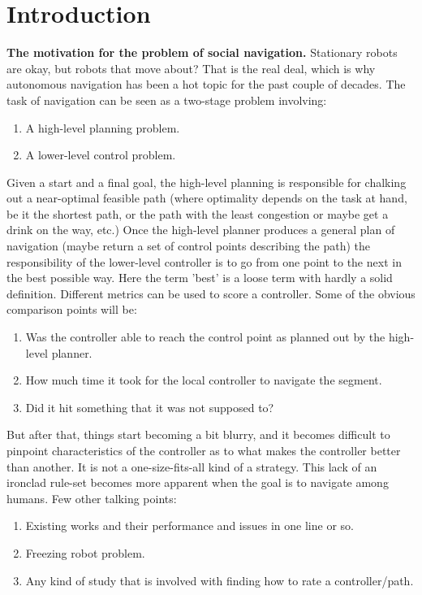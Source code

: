 \part{\rm\bfseries Introduction}
\label{ch:introduction}
\textbf{The motivation for the problem of social navigation.}
Stationary robots are okay, but robots that move about? That is the real deal, which is why autonomous navigation has been a hot topic for the past couple of decades. The task of navigation can be seen as a two-stage problem involving:
\begin{enumerate}
    \item A high-level planning problem.
    \item A lower-level control problem.
\end{enumerate}
Given a start and a final goal, the high-level planning is responsible for chalking out a near-optimal feasible path (where optimality depends on the task at hand, be it the shortest path, or the path with the least congestion or maybe get a drink on the way, etc.) Once the high-level planner produces a general plan of navigation (maybe return a set of control points describing the path) the responsibility of the lower-level controller is to go from one point to the next in the best possible way.
Here the term 'best' is a loose term with hardly a solid definition. Different metrics can be used to score a controller. Some of the obvious comparison points will be:
\begin{enumerate}
	\item Was the controller able to reach the control point as planned out by the high-level planner.
	\item How much time it took for the local controller to navigate the segment.
	\item Did it hit something that it was not supposed to?
\end{enumerate}
But after that, things start becoming a bit blurry, and it becomes difficult to pinpoint characteristics of the controller as to what makes the controller better than another. It is not a one-size-fits-all kind of a strategy. This lack of an ironclad rule-set becomes more apparent when the goal is to navigate among humans.
Few other talking points:
\begin{enumerate}
	\item Existing works and their performance and issues in one line or so.
	\item Freezing robot problem.
	\item Any kind of study that is involved with finding how to rate a controller/path. 
\end{enumerate}

